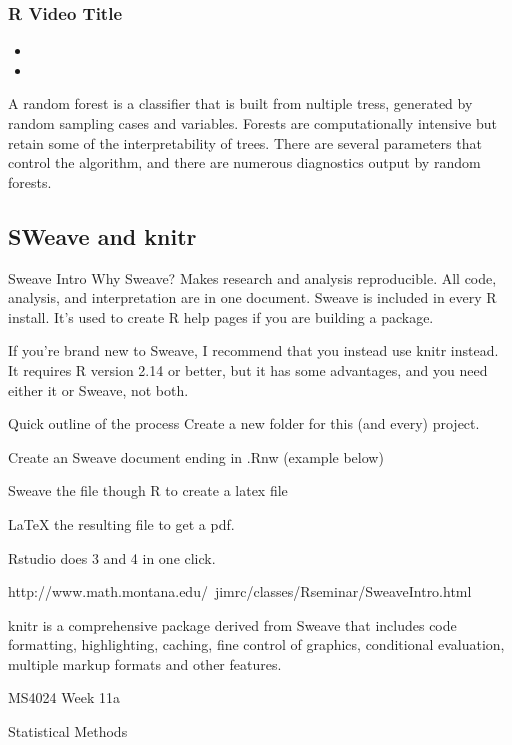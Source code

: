 \begin{frame}
\frametitle{R Video Title}
\begin{itemize}
\item
\item
\end{itemize}

A random forest is a classifier that is built from nultiple tress, generated by random sampling cases and variables.
Forests are computationally intensive but retain some of the interpretability of trees. There are several parameters that control the algorithm, and there
 are numerous diagnostics output by random forests.

\subsection{SWeave and knitr}

Sweave Intro
Why Sweave?
Makes research and analysis reproducible.
All code, analysis, and interpretation are in one document.
Sweave is included in every R install. It's used to create R help pages if you are building a package. 

If you're brand new to Sweave, I recommend that you instead use knitr instead.
 It requires R version 2.14 or better, but it has some advantages, and you need either it or Sweave, not both.

Quick outline of the process
 Create a new folder for this (and every) project. 

Create an Sweave document ending in .Rnw (example below) 

Sweave the file though R to create a latex file 

LaTeX the resulting file to get a pdf. 

Rstudio does 3 and 4 in one click. 

http://www.math.montana.edu/~jimrc/classes/Rseminar/SweaveIntro.html

knitr is a comprehensive package derived from Sweave that includes code formatting, highlighting, caching, fine control of graphics, conditional evaluation, multiple markup formats and other features. 





  

 

MS4024 Week 11a

 

Statistical Methods


\end{frame}
